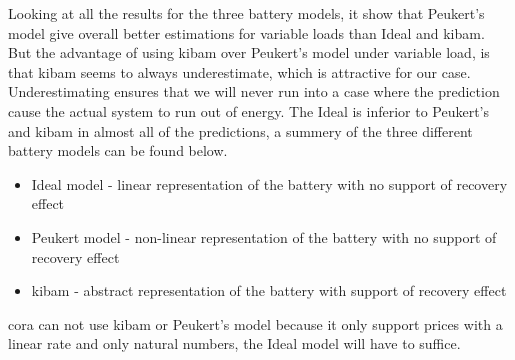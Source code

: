 Looking at all the results for the three battery models, it show that Peukert's model give overall better estimations for variable loads than Ideal and \gls{kibam}. 
But the advantage of using \gls{kibam} over Peukert's model under variable load, is that \gls{kibam} seems to always underestimate, which is attractive for our case.
Underestimating ensures that we will never run into a case where the prediction cause the actual system to run out of energy.
The Ideal is inferior to Peukert's and \gls{kibam} in almost all of the predictions, a summery of the three different battery models can be found below.
\begin{itemize}
	\item Ideal model - linear representation of the battery with no support of recovery effect
	\item Peukert model - non-linear representation of the battery with no support of recovery effect
	\item \gls{kibam} - abstract representation of the battery with support of recovery effect
\end{itemize}
\gls{cora} can not use \gls{kibam} or Peukert's model because it only support prices with a linear rate and only natural numbers, the Ideal model will have to suffice.
